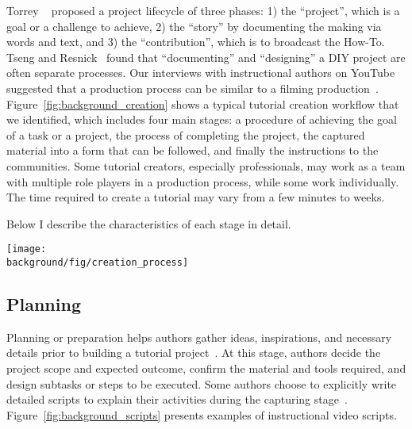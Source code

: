 Torrey \ea{}~\cite{Torrey:2007he} proposed a project lifecycle of three phases: 1) the ``project'', which is a goal or a challenge to achieve, 2) the ``story'' by documenting the making via words and text, and 3) the ``contribution'', which is to broadcast the How-To.
%
Tseng and Resnick~\cite{Tseng:2014:PVP:2598510.2598540} found that ``documenting'' and ``designing'' a DIY project are often separate processes.
%
Our interviews with instructional authors on YouTube suggested that a production process can be similar to a filming production~\cite{Chi:2013:DGC:2501988.2502052}.
%
Figure~\ref{fig:background_creation} shows a typical tutorial creation workflow that we identified, which includes four main stages:  a procedure of achieving the goal of a task or a project,  the process of completing the project,  the captured material into a form that can be followed, and finally  the instructions to the communities.
%
Some tutorial creators, especially professionals, may work as a team with multiple role players in a production process, while some work individually. The time required to create a tutorial may vary from a few minutes to weeks.

Below I describe the characteristics of each stage in detail.

\begin{figure*}[h!]
  \centering
  \texttt{[image: \\background/fig/creation\_process]}
  \caption{A common workflow of tutorial creation, which includes planning the task in detail, recording the process, editing the captured content into a readable form, and sharing with the communities.}
  \label{fig:background_creation}
\end{figure*}


\subsection{Planning}
Planning or preparation helps authors gather ideas, inspirations, and necessary details prior to building a tutorial project~\cite{Torrey:2007he}. At this stage, authors decide the project scope and expected outcome, confirm the material and tools required, and design subtasks or steps to be executed. Some authors choose to explicitly write detailed scripts to explain their activities during the capturing stage~\cite{Chi:2013:DGC:2501988.2502052}. Figure~\ref{fig:background_scripts} presents examples of instructional video scripts.

